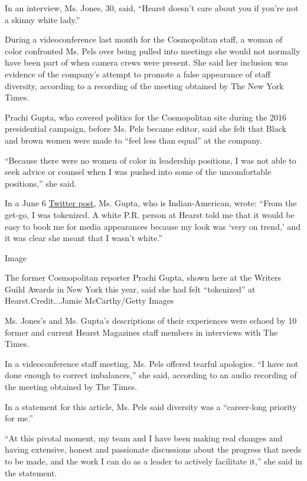 In an interview, Ms. Jones, 30, said, ``Hearst doesn't care about you if
you're not a skinny white lady.''

During a videoconference last month for the Cosmopolitan staff, a woman
of color confronted Ms. Pels over being pulled into meetings she would
not normally have been part of when camera crews were present. She said
her inclusion was evidence of the company's attempt to promote a false
appearance of staff diversity, according to a recording of the meeting
obtained by The New York Times.

Prachi Gupta, who covered politics for the Cosmopolitan site during the
2016 presidential campaign, before Ms. Pels became editor, said she felt
that Black and brown women were made to ``feel less than equal'' at the
company.

``Because there were no women of color in leadership positions, I was
not able to seek advice or counsel when I was pushed into some of the
uncomfortable positions,'' she said.

In a June 6
\href{https://twitter.com/prachigu/status/1269362844522426371?s=20}{Twitter
post}, Ms. Gupta, who is Indian-American, wrote: ``From the get-go, I
was tokenized. A white P.R. person at Hearst told me that it would be
easy to book me for media appearances because my look was `very on
trend,' and it was clear she meant that I wasn't white.''

Image

The former Cosmopolitan reporter Prachi Gupta, shown here at the Writers
Guild Awards in New York this year, said she had felt ``tokenized'' at
Hearst.Credit...Jamie McCarthy/Getty Images

Ms. Jones's and Ms. Gupta's descriptions of their experiences were
echoed by 10 former and current Hearst Magazines staff members in
interviews with The Times.

In a videoconference staff meeting, Ms. Pels offered tearful apologies.
``I have not done enough to correct imbalances,'' she said, according to
an audio recording of the meeting obtained by The Times.

In a statement for this article, Ms. Pels said diversity was a
``career-long priority for me.''

``At this pivotal moment, my team and I have been making real changes
and having extensive, honest and passionate discussions about the
progress that needs to be made, and the work I can do as a leader to
actively facilitate it,'' she said in the statement.

